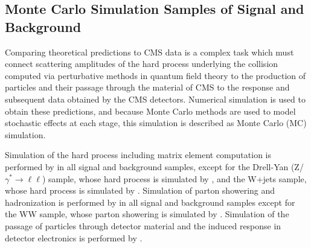 \subsection{Monte Carlo Simulation Samples of Signal and Background}
Comparing theoretical predictions to CMS data is a complex task which must connect scattering amplitudes of the hard process underlying the \pp collision computed via perturbative methods in quantum field theory to the production of particles and their passage through the material of CMS to the response and subsequent data obtained by the CMS detectors.
Numerical simulation is used to obtain these predictions, and because Monte Carlo methods are used to model stochastic effects at each stage, this simulation is described as Monte Carlo (MC) simulation.

Simulation of the hard process including matrix element computation is performed by \POWHEG in all signal and background samples, except for the Drell-Yan (Z/$\gamma^* \to \ell\ell$) sample, whose hard process is simulated by \MGvATNLO, and the W+jets sample, whose hard process is simulated by \MADGRAPH.
Simulation of parton showering and hadronization is performed by  in all signal and background samples except for the WW sample, whose parton showering is simulated by \HERWIGpp.
Simulation of the passage of particles through detector material and the induced response in detector electronics is performed by \GEANTfour.

